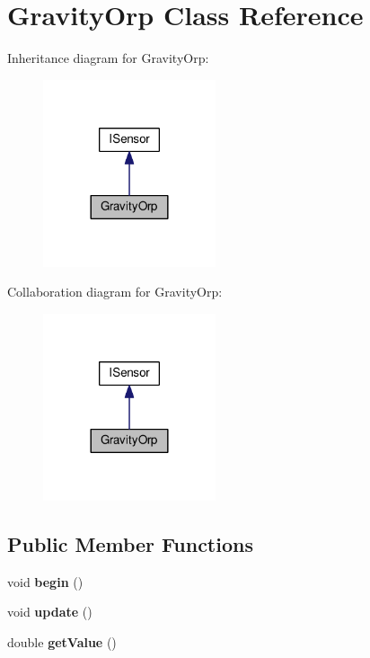 \hypertarget{class_gravity_orp}{}\section{Gravity\+Orp Class Reference}
\label{class_gravity_orp}


Inheritance diagram for Gravity\+Orp\+:\nopagebreak
\begin{figure}[H]
\begin{center}
\leavevmode
\includegraphics[width=144pt]{class_gravity_orp__inherit__graph}
\end{center}
\end{figure}


Collaboration diagram for Gravity\+Orp\+:\nopagebreak
\begin{figure}[H]
\begin{center}
\leavevmode
\includegraphics[width=144pt]{class_gravity_orp__coll__graph}
\end{center}
\end{figure}
\subsection*{Public Member Functions}
\begin{DoxyCompactItemize}
\item 
void {\bfseries begin} ()\hypertarget{class_gravity_orp_a03543b2abbe0be53f2dfb799b22b3aef}{}\label{class_gravity_orp_a03543b2abbe0be53f2dfb799b22b3aef}

\item 
void {\bfseries update} ()\hypertarget{class_gravity_orp_aa39d1bf33bcf7f4f415fd51d8129d15a}{}\label{class_gravity_orp_aa39d1bf33bcf7f4f415fd51d8129d15a}

\item 
double {\bfseries get\+Value} ()\hypertarget{class_gravity_orp_a2b4da109c95a3415fc70b9523bd13700}{}\label{class_gravity_orp_a2b4da109c95a3415fc70b9523bd13700}

\end{DoxyCompactItemize}
